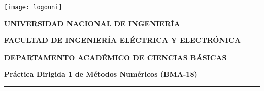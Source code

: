 


\noindent\parbox[c]{.18\textwidth}{\texttt{[image: logouni]}}\hfill
\parbox[c]{1\textwidth}{\raggedright%
    {\large\textbf{UNIVERSIDAD NACIONAL DE INGENIERÍA} \par\smallskip}
    {\large\textbf{FACULTAD DE INGENIERÍA ELÉCTRICA Y ELECTRÓNICA} \par\smallskip}
    {\large\textbf{DEPARTAMENTO ACADÉMICO DE CIENCIAS BÁSICAS} \par\smallskip}
}

\begin{center}\bfseries\large
    Práctica Dirigida 1 de Métodos Numéricos (BMA-18)
\end{center}

\vspace{-0.5cm}

\hrulefill
\vspace{-2.5mm}

\rule{16.5cm}{0.8mm}


